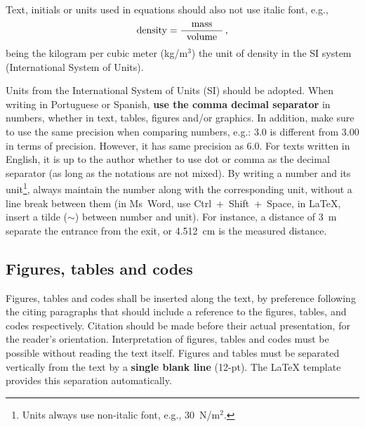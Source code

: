 \documentclass[12pt, a4paper, twoside, twocolumn]{article}
\begin{document}
Text, initials or units used in equations should also not use italic font, e.g.,
\begin{equation}
	\text{density} = \frac{\text{mass}}{\;\;\text{volume}\;\;}\,,
\label{eq:densidade}
\end{equation}
being the kilogram  per cubic meter (kg/m$^3$) the unit of density in the SI system (International System of Units).

Units from the International System of Units (SI) should be adopted. When writing in Portuguese or Spanish, \textbf{use the comma decimal separator} in numbers, whether in text, tables, figures and/or graphics. In addition, make sure to use the same precision when comparing numbers, e.g.: 3.0 is different from 3.00 in terms of precision. However, it has same precision as 6.0. For texts written in English, it is up to the author whether to use dot or comma as the decimal separator (as long as the notations are not mixed). By writing a number and its unit\footnote{Units always use non-italic font, e.g., 30~N/m$^2$.}, always maintain the number along with the corresponding unit, without a line break between them (in Ms~Word, use Ctrl~+~Shift~+~Space, in \LaTeX, insert a tilde ($\sim$) between number and unit). For instance, a distance of 3~m separate the entrance from the exit, or 4.512~cm is the measured distance.

\subsection{Figures, tables and codes}

Figures, tables and codes shall be inserted along the text, by preference following the citing paragraphs that should include a  reference to the figures, tables, and codes respectively. Citation should be made before their actual presentation, for the reader's orientation. Interpretation of figures, tables and codes must be possible without reading the text itself. Figures and tables must be separated vertically from the text by a \textbf{single blank line} (12-pt). The \LaTeX{} template provides this separation automatically.
\end{document}
